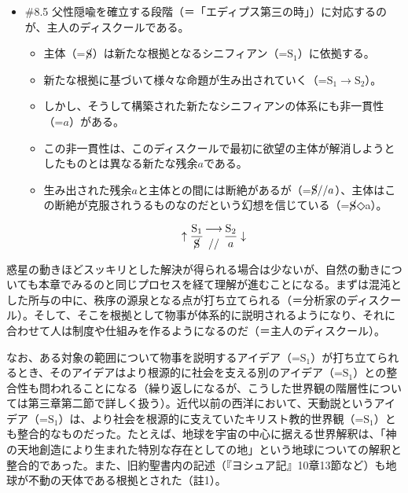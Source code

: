 \begin{note}{}
  \begin{itemize}
    \tightlist
    \item{\#8.5}
      父性隠喩を確立する段階（＝「エディプス第三の時」）に対応するのが、\mbox{主人のディスクール}である。
      \begin{itemize}
          \tightlist
          \item
          主体（=$\cancel{\textrm{S}}$）は新たな根拠となるシニフィアン（=$\textrm{S}_1$）に依拠する。
          \item
          新たな根拠に基づいて様々な命題が生み出されていく（=$\textrm{S}_1\rightarrow\textrm{S}_2$）。
          \item
          しかし、そうして構築された新たなシニフィアンの体系にも非一貫性（=$a$）がある。
          \item
          この非一貫性は、このディスクールで最初に欲望の主体が解消しようとしたものとは異なる新たな残余$a$である。
          \item
          生み出された残余$a$と主体との間には断絶があるが（=$\cancel{\textrm{S}}//a$）、主体はこの断絶が克服されうるものなのだという幻想を信じている（=$\cancel{\textrm{S}}$◇a）。
        \end{itemize}

$$
\uparrow\frac{\mathrm{S_1}}{\cancel{\textrm{S}}}\genfrac{}{}{0pt}{}{\longrightarrow}{//}\frac{\mathrm{S_2}}{a}\downarrow
$$
  \end{itemize}
\end{note}

惑星の動きほどスッキリとした解決が得られる場合は少ないが、自然の動きについても本章でみるのと同じプロセスを経て理解が進むことになる。まずは混沌とした所与の中に、秩序の源泉となる点が打ち立てられる（＝\mbox{分析家のディスクール}）。そして、そこを根拠として物事が体系的に説明されるようになり、それに合わせて人は制度や仕組みを作るようになるのだ（＝\mbox{主人のディスクール}）。

なお、ある対象の範囲について物事を説明するアイデア（=\(\textrm{S}_1\)）が打ち立てられるとき、そのアイデアはより根源的に社会を支える別のアイデア（=\(\textrm{S}_1\)）との整合性も問われることになる（繰り返しになるが、こうした世界観の階層性については第三章第二節で詳しく扱う）。近代以前の西洋において、天動説というアイデア（=\(\textrm{S}_1\)）は、より社会を根源的に支えていたキリスト教的世界観（=\(\textrm{S}_1\)）とも整合的なものだった。たとえば、地球を宇宙の中心に据える世界解釈は、「神の天地創造により生まれた特別な存在としての地」という地球についての解釈と整合的であった。また、旧約聖書内の記述（『ヨシュア記』10章13節など）も地球が不動の天体である根拠とされた（註1）。

